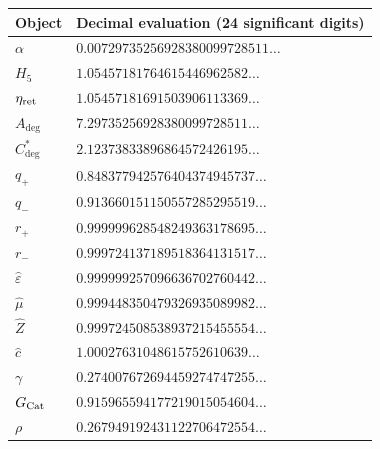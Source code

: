 \begin{longtable}{@{}ll@{}}
\toprule
Object & Decimal evaluation (24 significant digits)\\
\midrule\endhead
$\alpha$ & $0.00729735256928380099728511\ldots$ \\
$H_5$ & $1.05457181764615446962582\ldots$ \\
$\eta_{\rm ret}$ & $1.05457181691503906113369\ldots$ \\
$A_{\deg}$ & $7.29735256928380099728511\ldots$ \\
$C^*_{\deg}$ & $2.12373833896864572426195\ldots$ \\
$q_+$ & $0.848377942576404374945737\ldots$ \\
$q_-$ & $0.913660151150557285295519\ldots$ \\
$r_+$ & $0.999999628548249363178695\ldots$ \\
$r_-$ & $0.999724137189518364131517\ldots$ \\
$\widehat\varepsilon$ & $0.999999257096636702760442\ldots$ \\
$\widehat\mu$ & $0.999448350479326935089982\ldots$ \\
$\widehat Z$ & $0.999724508538937215455554\ldots$ \\
$\widehat c$ & $1.00027631048615752610639\ldots$ \\
$\gamma$ & $0.274007672694459274747255\ldots$ \\
$G_{\rm Cat}$ & $0.915965594177219015054604\ldots$ \\
$\rho$ & $0.267949192431122706472554\ldots$ \\
\bottomrule
\end{longtable}
